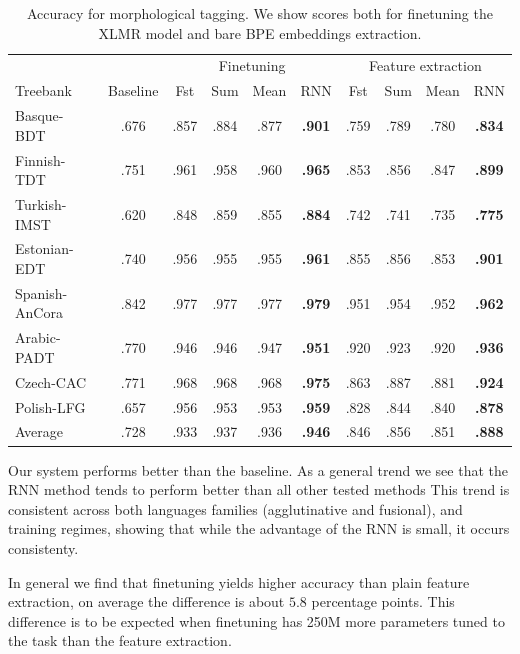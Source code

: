 \documentclass[11pt]{article}
\begin{document}
    \begin{table}%
	\centering
	\begin{tabular}{l|c|cccc|cccc}
		& & \multicolumn{4}{c}{Finetuning} & \multicolumn{4}{c}{Feature extraction} \\
		Treebank & Baseline & Fst & Sum & Mean & RNN & Fst & Sum & Mean & RNN \\
		\hline
		Basque-BDT      & .676 & .857 & .884 & .877 & \textbf{.901} & .759 & .789 & .780 & \textbf{.834} \\
		Finnish-TDT     & .751 & .961 & .958 & .960 & \textbf{.965} & .853 & .856 & .847 & \textbf{.899} \\
		Turkish-IMST    & .620 & .848 & .859 & .855 & \textbf{.884} & .742 & .741 & .735 & \textbf{.775} \\
		Estonian-EDT    & .740 & .956 & .955 & .955 & \textbf{.961} & .855 & .856 & .853 & \textbf{.901} \\
		Spanish-AnCora  & .842 & .977 & .977 & .977 & \textbf{.979} & .951 & .954 & .952 & \textbf{.962} \\
		Arabic-PADT     & .770 & .946 & .946 & .947 & \textbf{.951} & .920 & .923 & .920 & \textbf{.936} \\
		Czech-CAC       & .771 & .968 & .968 & .968 & \textbf{.975} & .863 & .887 & .881 & \textbf{.924} \\
		Polish-LFG      & .657 & .956 & .953 & .953 & \textbf{.959} & .828 & .844 & .840 & \textbf{.878} \\
        \hline
        Average         & .728 & .933 & .937 & .936 & \textbf{.946} & .846 & .856 & .851 & \textbf{.888} \\
	\end{tabular}
    	\caption{\label{tab:results_tokens} Accuracy for morphological
          tagging. We show scores both for finetuning the XLMR model and
          bare BPE embeddings extraction.}
    \end{table}


            Our system performs better than the baseline. As a general
            trend we see that the RNN method tends to perform better than all other tested methods
            This trend is
     consistent across both languages families (agglutinative and
     fusional), and training regimes, showing that while the advantage
     of the RNN is small, it occurs consistenty.

        In general we find that finetuning yields higher accuracy than
        plain feature extraction, on average the difference is about $5.8$
        percentage points.  This difference is to be expected when
        finetuning has 250M more parameters tuned to the task than the
        feature extraction. %
    
\end{document}
